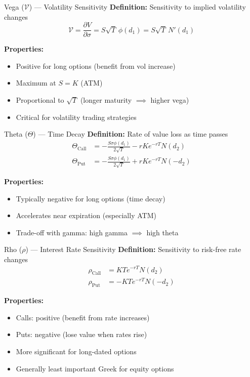 \documentclass[10pt,twocolumn]{article}
\begin{document}
\begin{keybox}{Vega ($\mathcal{V}$) --- Volatility Sensitivity}
\textbf{Definition:} Sensitivity to implied volatility changes
\begin{equation}
\mathcal{V} = \frac{\partial V}{\partial \sigma} = S\sqrt{T}\,\phi(d_1) = S\sqrt{T}\,N'(d_1)
\end{equation}

\textbf{Properties:}
\begin{itemize}[itemsep=1pt]
    \item Positive for long options (benefit from vol increase)
    \item Maximum at $S = K$ (ATM)
    \item Proportional to $\sqrt{T}$ (longer maturity $\implies$ higher vega)
    \item Critical for volatility trading strategies
\end{itemize}
\end{keybox}

\begin{keybox}{Theta ($\Theta$) --- Time Decay}
\textbf{Definition:} Rate of value loss as time passes
\begin{align}
\Theta_{\text{Call}} &= -\frac{S\sigma\phi(d_1)}{2\sqrt{T}} - rKe^{-rT}N(d_2)\\
\Theta_{\text{Put}} &= -\frac{S\sigma\phi(d_1)}{2\sqrt{T}} + rKe^{-rT}N(-d_2)
\end{align}

\textbf{Properties:}
\begin{itemize}[itemsep=1pt]
    \item Typically negative for long options (time decay)
    \item Accelerates near expiration (especially ATM)
    \item Trade-off with gamma: high gamma $\implies$ high theta
\end{itemize}
\end{keybox}

\begin{keybox}{Rho ($\rho$) --- Interest Rate Sensitivity}
\textbf{Definition:} Sensitivity to risk-free rate changes
\begin{align}
\rho_{\text{Call}} &= KTe^{-rT}N(d_2)\\
\rho_{\text{Put}} &= -KTe^{-rT}N(-d_2)
\end{align}

\textbf{Properties:}
\begin{itemize}[itemsep=1pt]
    \item Calls: positive (benefit from rate increases)
    \item Puts: negative (lose value when rates rise)
    \item More significant for long-dated options
    \item Generally least important Greek for equity options
\end{itemize}
\end{keybox}
\end{document}
